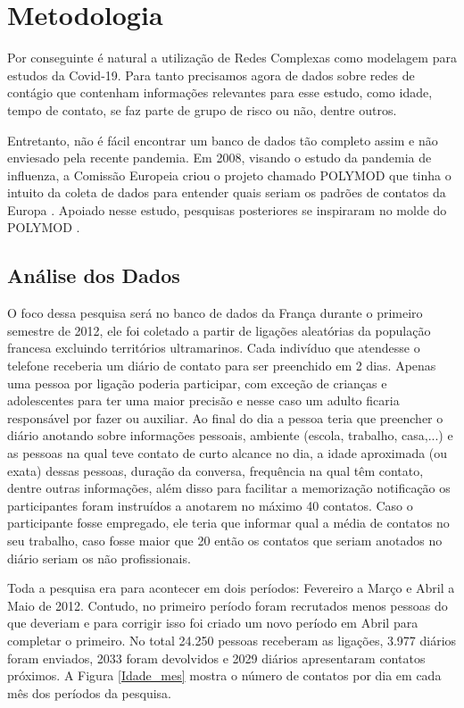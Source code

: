 \chapter{Metodologia}

Por conseguinte é natural a utilização de Redes Complexas como modelagem para estudos da Covid-19. Para tanto precisamos agora de dados sobre redes de contágio que contenham informações relevantes para esse estudo, como idade, tempo de contato, se faz parte de grupo de risco ou não, dentre outros.

Entretanto, não é fácil encontrar um banco de dados tão completo assim e não enviesado pela recente pandemia. Em 2008, visando o estudo da pandemia de influenza, a Comissão Europeia criou o projeto chamado POLYMOD \cite{POLYMOD} que tinha o intuito da coleta de dados para entender quais seriam os padrões de contatos da Europa \cite{Mossong2008}. Apoiado nesse estudo, pesquisas posteriores se inspiraram no molde do POLYMOD \cite{Belga2009,Belga2010,China,France,HongKong,Peru,Russia,Thailand,Vietnam,Zambia,Zimbabwe}.

\section{Análise dos Dados}

O foco dessa pesquisa será no banco de dados da França \cite{France} durante o primeiro semestre de 2012, ele foi coletado a partir de ligações aleatórias da população francesa excluindo territórios ultramarinos. Cada indivíduo que atendesse o telefone receberia um diário de contato para ser preenchido em 2 dias. Apenas uma pessoa por ligação poderia participar, com exceção de crianças e adolescentes para ter uma maior precisão e nesse caso um adulto ficaria responsável por fazer ou auxiliar. Ao final do dia a pessoa teria que preencher o diário anotando sobre informações pessoais, ambiente (escola, trabalho, casa,...) e as pessoas na qual teve contato de curto alcance no dia, a idade aproximada (ou exata) dessas pessoas, duração da conversa, frequência na qual têm contato, dentre outras informações, além disso para facilitar a memorização notificação os participantes foram instruídos a anotarem no máximo 40 contatos. Caso o participante fosse empregado, ele teria que informar qual a média de contatos no seu trabalho, caso fosse maior que 20 então os contatos que seriam anotados no diário seriam os não profissionais.

Toda a pesquisa era para acontecer em dois períodos: Fevereiro a Março e Abril a Maio de 2012. Contudo, no primeiro período foram recrutados menos pessoas do que deveriam e para corrigir isso foi criado um novo período em Abril para completar o primeiro. No total 24.250 pessoas receberam as ligações, 3.977 diários foram enviados, 2033 foram devolvidos e 2029 diários apresentaram contatos próximos. A Figura \ref{Idade_mes} mostra o número de contatos por dia em cada mês dos períodos da pesquisa.

